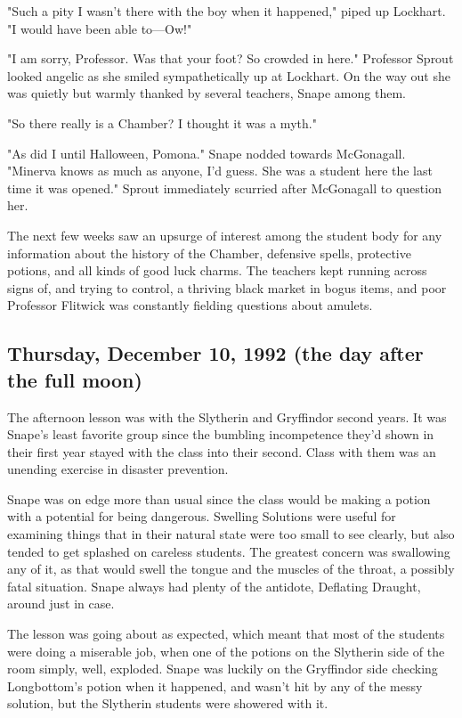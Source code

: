 "Such a pity I wasn't there with the boy when it happened," piped up Lockhart. "I would have been able to—Ow!"

"I am sorry, Professor. Was that your foot? So crowded in here." Professor Sprout looked angelic as she smiled sympathetically up at Lockhart. On the way out she was quietly but warmly thanked by several teachers, Snape among them.

"So there really is a Chamber? I thought it was a myth."

"As did I until Halloween, Pomona." Snape nodded towards McGonagall. "Minerva knows as much as anyone, I'd guess. She was a student here the last time it was opened." Sprout immediately scurried after McGonagall to question her.

The next few weeks saw an upsurge of interest among the student body for any information about the history of the Chamber, defensive spells, protective potions, and all kinds of good luck charms. The teachers kept running across signs of, and trying to control, a thriving black market in bogus items, and poor Professor Flitwick was constantly fielding questions about amulets.

\subsection{Thursday, December 10, 1992 (the day after the full moon)}

The afternoon lesson was with the Slytherin and Gryffindor second years. It was Snape's least favorite group since the bumbling incompetence they'd shown in their first year stayed with the class into their second. Class with them was an unending exercise in disaster prevention.

Snape was on edge more than usual since the class would be making a potion with a potential for being dangerous. Swelling Solutions were useful for examining things that in their natural state were too small to see clearly, but also tended to get splashed on careless students. The greatest concern was swallowing any of it, as that would swell the tongue and the muscles of the throat, a possibly fatal situation. Snape always had plenty of the antidote, Deflating Draught, around just in case.

The lesson was going about as expected, which meant that most of the students were doing a miserable job, when one of the potions on the Slytherin side of the room simply, well, exploded. Snape was luckily on the Gryffindor side checking Longbottom's potion when it happened, and wasn't hit by any of the messy solution, but the Slytherin students were showered with it.

